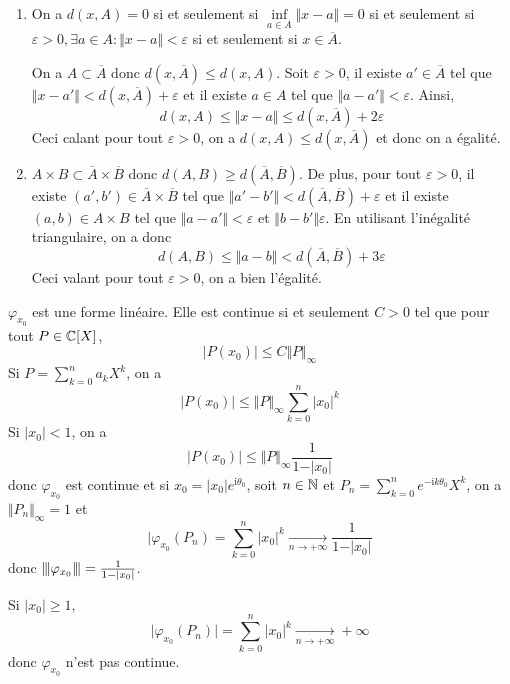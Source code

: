 \begin{solution}
	\phantom{}
	\begin{enumerate}
		\item On a $d(x,A)=0$ si et seulement si $\inf\limits_{a\in A}\Vert x-a\Vert=0$ si et seulement si $\varepsilon>0,\exists a\in A\colon\Vert x-a\Vert<\varepsilon$ si et seulement si $x\in\overline{A}$.

		On a $A\subset\overline{A}$ donc $d(x,\overline{A})\leqslant d(x,A)$. Soit $\varepsilon>0$, il existe $a'\in \overline{A}$ tel que $\Vert x-a'\Vert<d(x,\overline{A})+\varepsilon$ et il existe $a\in A$ tel que $\Vert a-a'\Vert<\varepsilon$. Ainsi, 
		$$d(x,A)\leqslant\Vert x-a\Vert\leqslant d(x,\overline{A})+2\varepsilon$$
		Ceci calant pour tout $\varepsilon>0$, on a $d(x,A)\leqslant d(x,\overline{A})$ et donc on a égalité.

		\item $A\times B\subset\overline{A}\times\overline{B}$ donc $d(A,B)\geqslant d(\overline{A},\overline{B})$. De plus, pour tout $\varepsilon>0$, il existe $(a',b')\in\overline{A}\times\overline{B}$ tel que $\Vert a'-b'\Vert<d(\overline{A},\overline{B})+\varepsilon$ et il existe $(a,b)\in A\times B$ tel que $\Vert a-a'\Vert<\varepsilon$ et $\Vert b-b'\Vert\varepsilon$. En utilisant l'inégalité triangulaire, on a donc 
		$$d(A,B)\leqslant\Vert a-b\Vert<d(\overline{A},\overline{B})+3\varepsilon$$
		Ceci valant pour tout $\varepsilon>0$, on a bien l'égalité.
	\end{enumerate}
\end{solution}

\begin{solution}
	$\varphi_{x_{0}}$ est une forme linéaire. Elle est continue si et seulement $C>0$ tel que pour tout $P\in\mathbb{C}[X]$,
	$$\vert P(x_{0})\vert\leqslant C\Vert P\Vert_{\infty}$$
	Si $P=\sum_{k=0}^{n}a_{k}X^{k}$, on a 
	$$\vert P(x_{0})\vert\leqslant \Vert P\Vert_{\infty}\sum_{k=0}^{n}\vert x_{0}\vert^{k}$$
	Si $\vert x_{0}\vert<1$, on a 
	$$\vert P(x_{0})\vert\leqslant \Vert P\Vert_{\infty}\frac{1}{1-\vert x_{0}\vert}$$
	donc $\varphi_{x_{0}}$ est continue et si $x_{0}=\vert x_{0}\vert e^{\mathrm{i}\theta_{0}}$, soit $n\in\mathbb{N}$ et $P_{n}=\sum_{k=0}^{n}e^{-\mathrm{i}k\theta_{0}}X^{k}$, on a $\Vert P_{n}\Vert_{\infty}=1$ et 
	$$\vert \varphi_{x_{0}}(P_{n})=\sum_{k=0}^{n}\vert x_{0}\vert^{k}\xrightarrow[n\to+\infty]{}\frac{1}{1-\vert x_{0}\vert}$$
	donc ${\left\vert\kern-0.25ex\left\vert\kern-0.25ex\left\vert{}\varphi_{x_{0}} \right\vert\kern-0.25ex\right\vert\kern-0.25ex\right\vert}=\frac{1}{1-\vert x_{0}\vert}$.

	Si $\vert x_{0}\vert\geqslant1$, 
	$$\vert\varphi_{x_0}(P_{n})\vert=\sum_{k=0}^{n}\vert x_{0}\vert^{k}\xrightarrow[n\to+\infty]{}+\infty$$
	donc $\varphi_{x_{0}}$ n'est pas continue.
\end{solution}

